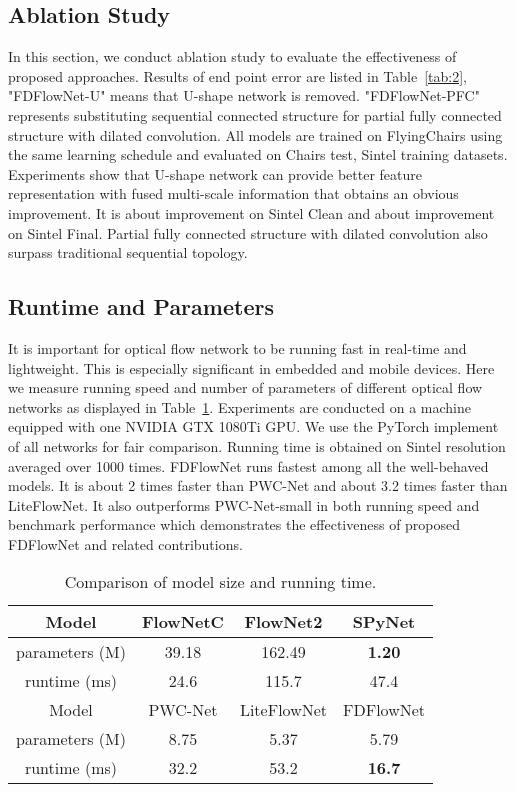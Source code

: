 \documentclass{article}
\begin{document}
\subsection{Ablation Study}
In this section, we conduct ablation study to evaluate the effectiveness of proposed approaches. Results of end point error are listed in Table~\ref{tab:2}, "FDFlowNet-U" means that U-shape network is removed. "FDFlowNet-PFC" represents substituting sequential connected structure for partial fully connected structure with dilated convolution. All models are trained on FlyingChairs using the same learning schedule and evaluated on Chairs test, Sintel training datasets. Experiments show that U-shape network can provide better feature representation with fused multi-scale information that obtains an obvious improvement. It is about  improvement on Sintel Clean and about  improvement on Sintel Final. Partial fully connected structure with dilated convolution also surpass traditional sequential topology.

\subsection{Runtime and Parameters}
It is important for optical flow network to be running fast in real-time and lightweight. This is especially significant in embedded and mobile devices. Here we measure running speed and number of parameters of different optical flow networks as displayed in Table~\ref{tab:3}. Experiments are conducted on a machine equipped with one NVIDIA GTX 1080Ti GPU. We use the PyTorch implement of all networks for fair comparison. Running time is obtained on Sintel resolution  averaged over 1000 times. FDFlowNet runs fastest among all the well-behaved models. It is about 2 times faster than PWC-Net and about 3.2 times faster than LiteFlowNet. It also outperforms PWC-Net-small in both running speed and benchmark performance which demonstrates the effectiveness of proposed FDFlowNet and related contributions.

\begin{table}[t]
\small
\renewcommand\arraystretch{1.2}
\centering
\begin{tabular}{c|c|c|c}
	Model & FlowNetC & FlowNet2 & SPyNet \\
	\hline
	parameters (M) & 39.18 & 162.49 & {\bf 1.20} \\
	\hline
	runtime (ms) & 24.6 & 115.7 & 47.4 \vspace{1mm} \\
	Model & PWC-Net & LiteFlowNet & FDFlowNet \\
	\hline
	parameters (M) & 8.75 & 5.37 & 5.79 \\
	\hline
	runtime (ms) & 32.2 & 53.2 & {\bf 16.7} \\
\end{tabular}
\caption{Comparison of model size and running time.}
\label{tab:3}
\end{table}
\end{document}
